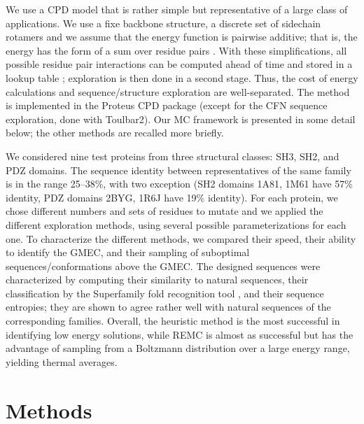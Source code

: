 We use a CPD model that is rather simple but representative of a large class of applications.
We use a fixe backbone structure, a discrete set of sidechain rotamers and we assume that the energy function is pairwise additive;
that is, the energy has the form of a sum over residue pairs \cite{Schmidt08b,Schmidt08,Simonson13b}.
With these simplifications, all possible residue pair interactions can be computed ahead of time and stored in a lookup table \cite{Dahiyat97}; exploration is then done in a second stage.
Thus, the cost of energy calculations and sequence/structure exploration are well-separated.
The method is implemented in the Proteus CPD package \cite{Schmidt08,Simonson13b} (except for the CFN sequence exploration, done with Toulbar2).
Our MC framework is presented in some detail below; the other methods are recalled more briefly.

We considered nine test proteins from three structural classes: SH3, SH2, and PDZ domains.
The sequence identity between representatives of the same family is in the range 25–38\%, with two exception (SH2 domains 1A81, 1M61 have 57\% identity, PDZ domains 2BYG, 1R6J have 19\% identity).
For each protein, we chose different numbers and sets of residues to mutate and we applied the different exploration methods, using several possible parameterizations for each one.
To characterize the different methods, we compared their speed, their ability to identify the GMEC, and their sampling of suboptimal sequences/conformations above the GMEC.
The designed sequences were characterized by computing their similarity to natural sequences, their classification
by the Superfamily fold recognition tool \cite{Gough01,Wilson07}, and their sequence entropies; they are shown to agree rather well with natural sequences of the corresponding families.
Overall, the heuristic method is the most successful in identifying low energy solutions, while REMC is almost as successful but has the advantage of sampling from a Boltzmann distribution over a large energy range, yielding thermal averages.

\section{Methods}
